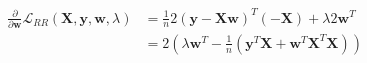 \newcommand{\matrix}[1]{\mathbf{#1}}
\newcommand{\vector}[1]{\mathbf{#1}}
\newcommand{\X}{\matrix{X}}
\newcommand{\y}{\vector{y}}
\newcommand{\w}{\vector{w}}
\begin{align*}
\frac{\partial}{\partial \w} \mathcal{L}_{RR} (\X,\y,\w,\lambda) &= \frac{1}{n} 2(\y - \X\w)^T (-\X) + \lambda 2 \w^T \\
&= 2 \left( \lambda \w^T - \frac{1}{n}(\y^T\X + \w^T\X^T\X) \right)
\end{align*}
